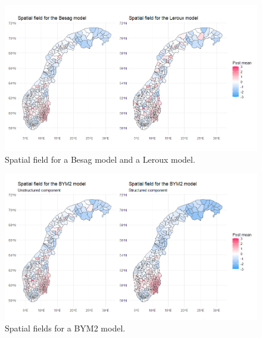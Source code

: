\begin{figure}[H]
    \centering
    \includegraphics[width = \textwidth]{spatial_field_norway_1.png}
    \caption{Spatial field for a Besag model and a Leroux model.}
    \label{comparison_norway_6}
\end{figure}
%     
\begin{figure}[H]
    \centering
    \includegraphics[width = \textwidth]{spatial_field_norway_2.png}
    \caption{Spatial fields for a BYM2 model.}
    \label{comparison_norway_7}
\end{figure}
%     
